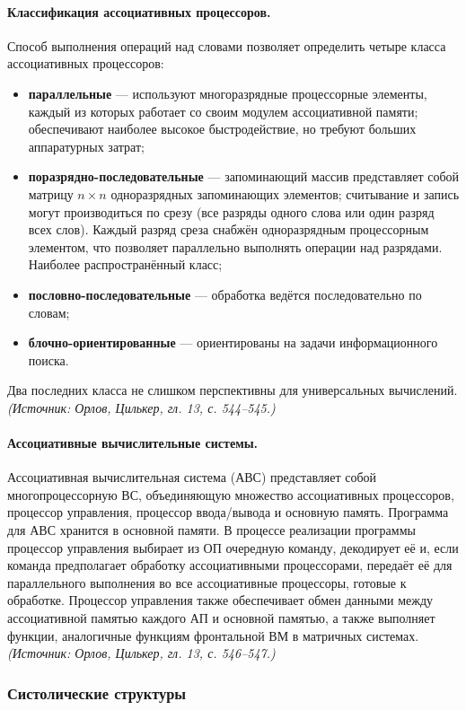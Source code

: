 \documentclass[a4paper,12pt]{article}
\begin{document}
\paragraph{Классификация ассоциативных процессоров.}
Способ выполнения операций над словами позволяет определить четыре класса ассоциативных процессоров:
\begin{itemize}
\item \textbf{параллельные} — используют многоразрядные процессорные элементы, каждый из которых работает со своим модулем ассоциативной памяти; обеспечивают наиболее высокое быстродействие, но требуют больших аппаратурных затрат;
\item \textbf{поразрядно-последовательные} — запоминающий массив представляет собой матрицу \(n\times n\) одноразрядных запоминающих элементов; считывание и запись могут производиться по срезу (все разряды одного слова или один разряд всех слов). Каждый разряд среза снабжён одноразрядным процессорным элементом, что позволяет параллельно выполнять операции над разрядами. Наиболее распространённый класс;
\item \textbf{пословно-последовательные} — обработка ведётся последовательно по словам;
\item \textbf{блочно-ориентированные} — ориентированы на задачи информационного поиска.
\end{itemize}
Два последних класса не слишком перспективны для универсальных вычислений.
\textit{(Источник: Орлов, Цилькер, гл. 13, с. 544--545.)}

\paragraph{Ассоциативные вычислительные системы.}
Ассоциативная вычислительная система (АВС) представляет собой многопроцессорную ВС, объединяющую множество ассоциативных процессоров, процессор управления, процессор ввода/вывода и основную память. Программа для АВС хранится в основной памяти. В процессе реализации программы процессор управления выбирает из ОП очередную команду, декодирует её и, если команда предполагает обработку ассоциативными процессорами, передаёт её для параллельного выполнения во все ассоциативные процессоры, готовые к обработке. Процессор управления также обеспечивает обмен данными между ассоциативной памятью каждого АП и основной памятью, а также выполняет функции, аналогичные функциям фронтальной ВМ в матричных системах.
\textit{(Источник: Орлов, Цилькер, гл. 13, с. 546--547.)}

\subsubsection{Систолические структуры}
\end{document}
